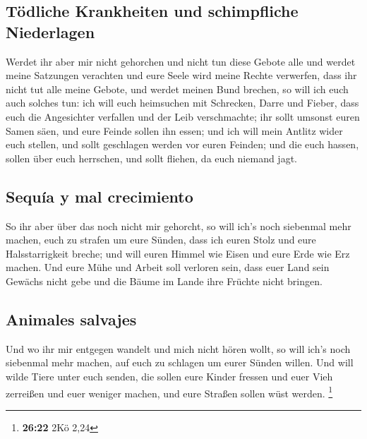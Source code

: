 \hypertarget{tuxf6dliche-krankheiten-und-schimpfliche-niederlagen}{%
\subsection{Tödliche Krankheiten und schimpfliche
Niederlagen}\label{tuxf6dliche-krankheiten-und-schimpfliche-niederlagen}}

 Werdet ihr aber mir nicht gehorchen und nicht tun diese
Gebote alle  und werdet meine Satzungen verachten und
eure Seele wird meine Rechte verwerfen, dass ihr nicht tut alle meine
Gebote, und werdet meinen Bund brechen,  so will ich euch
auch solches tun: ich will euch heimsuchen mit Schrecken, Darre und
Fieber, dass euch die Angesichter verfallen und der Leib verschmachte;
ihr sollt umsonst euren Samen säen, und eure Feinde sollen ihn essen;
 und ich will mein Antlitz wider euch stellen, und sollt
geschlagen werden vor euren Feinden; und die euch hassen, sollen über
euch herrschen, und sollt fliehen, da euch niemand jagt.

\hypertarget{sequuxeda-y-mal-crecimiento}{%
\subsection{Sequía y mal
crecimiento}\label{sequuxeda-y-mal-crecimiento}}

 So ihr aber über das noch nicht mir gehorcht, so will
ich's noch siebenmal mehr machen, euch zu strafen um eure Sünden,
 dass ich euren Stolz und eure Halsstarrigkeit breche;
und will euren Himmel wie Eisen und eure Erde wie Erz machen.
 Und eure Mühe und Arbeit soll verloren sein, dass euer
Land sein Gewächs nicht gebe und die Bäume im Lande ihre Früchte nicht
bringen.

\hypertarget{animales-salvajes}{%
\subsection{Animales salvajes}\label{animales-salvajes}}

 Und wo ihr mir entgegen wandelt und mich nicht hören
wollt, so will ich's noch siebenmal mehr machen, auf euch zu schlagen um
eurer Sünden willen.  Und will wilde Tiere unter euch
senden, die sollen eure Kinder fressen und euer Vieh zerreißen und euer
weniger machen, und eure Straßen sollen wüst werden. \footnote{\textbf{26:22}
  2Kö 2,24}

